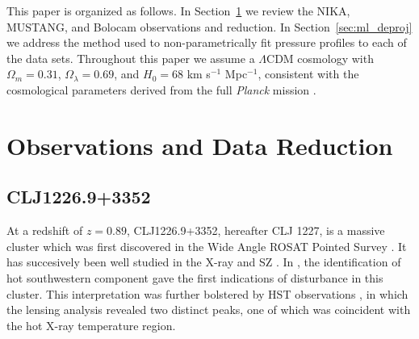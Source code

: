 \documentclass[twocolumn,traditabstract]{aa}
\begin{document}
This paper is organized as follows. In Section~\ref{sec:obs} we review the NIKA, MUSTANG, and Bolocam observations and reduction. 
In Section~\ref{sec:ml_deproj} we address the method used to non-parametrically fit pressure profiles to each of the data sets.
Throughout this paper we assume a $\Lambda$CDM cosmology with $\Omega_m = 0.31$, $\Omega_{\lambda} = 0.69$, and $H_0 = 68$ 
km s$^{-1}$ Mpc$^{-1}$, consistent with the cosmological parameters derived from the full \emph{Planck} mission
\citep{planck2016_cp}.

\section{Observations and Data Reduction}
\label{sec:obs}

\subsection{CLJ1226.9+3352}
\label{sec:sample_clj1227}



At a redshift of $z=0.89$, CLJ1226.9+3352, hereafter CLJ 1227, is a massive cluster which was first discovered in the
Wide Angle ROSAT Pointed Survey \citep[WARPS][]{ebeling2001}. It has succesively been well studied
in the X-ray
\citep[\emph{XMM},\emph{Chandra}, and \emph{XMM/Chandra}][, respectively]{maughan2004,bonamente2006,maughan2007}
and SZ \citep[][]{joy2001,muchovej2007,mroczkowski2009,mroczkowski2011,bulbul2010,korngut2011,adam2015}.
In \citet{maughan2007}, the identification of hot southwestern component gave the first indications of disturbance
in this cluster. This interpretation was further bolstered by HST observations \citep{jee2009}, in which the lensing
analysis revealed two distinct peaks, one of which was coincident with the hot X-ray temperature region.
\end{document}
